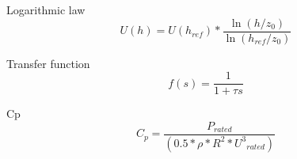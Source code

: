Logarithmic law
\begin{equation}
U(h)=U({{h}_{ref}})*\frac{\ln (h/{{z}_{0}})}{\ln ({{h}_{ref}}/{{z}_{0}})}
\end{equation}\label{loglaw}

Transfer function
\begin{equation}
f(s)=\frac{1}{1+\tau s}
\end{equation} 


Cp
\begin{equation}
    {{C}_{p}}=\frac{{{P}_{rated}}}{(0.5*\rho *{{R}^{2}}*{{U}^{3}}_{rated})}
\end{equation}